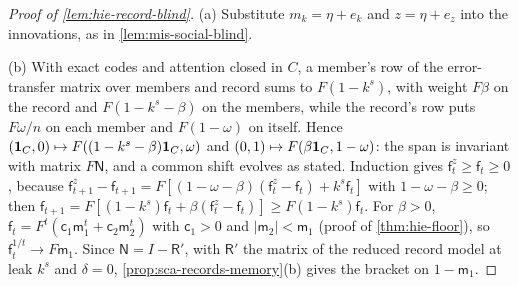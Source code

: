 \begin{proof}[Proof of \cref{lem:hie-record-blind}]
(a) Substitute $m_k=\eta+e_k$ and $z=\eta+e_z$ into the innovations, as in \cref{lem:mis-social-blind}.

(b) With exact codes and attention closed in $C$, a member's row of the error-transfer matrix over members and record sums to $F(1-k^s)$, with weight $F\beta$ on the record and $F(1-k^s-\beta)$ on the members, while the record's row puts $F\omega/n$ on each member and $F(1-\omega)$ on itself. Hence $(\mathbf{1}_C,0)\mapsto F((1-k^s-\beta)\mathbf{1}_C,\omega)$ and $(0,1)\mapsto F(\beta\mathbf{1}_C,1-\omega)$: the span is invariant with matrix $F\mathsf N$, and a common shift evolves as stated. Induction gives $\mathsf f^z_t\ge\mathsf f_t\ge0$, because $\mathsf f^z_{t+1}-\mathsf f_{t+1}=F[(1-\omega-\beta)(\mathsf f^z_t-\mathsf f_t)+k^s\mathsf f_t]$ with $1-\omega-\beta\ge0$; then $\mathsf f_{t+1}=F[(1-k^s)\mathsf f_t+\beta(\mathsf f^z_t-\mathsf f_t)]\ge F(1-k^s)\mathsf f_t$. For $\beta>0$, $\mathsf f_t=F^t(\mathsf c_1\mathsf m_1^t+\mathsf c_2\mathsf m_2^t)$ with $\mathsf c_1>0$ and $\lvert\mathsf m_2\rvert<\mathsf m_1$ (proof of \cref{thm:hie-floor}), so $\mathsf f_t^{1/t}\to F\mathsf m_1$. Since $\mathsf N=I-\mathsf R'$, with $\mathsf R'$ the matrix of the reduced record model at leak $k^s$ and $\delta=0$, \cref{prop:sca-records-memory}(b) gives the bracket on $1-\mathsf m_1$.
\end{proof}

